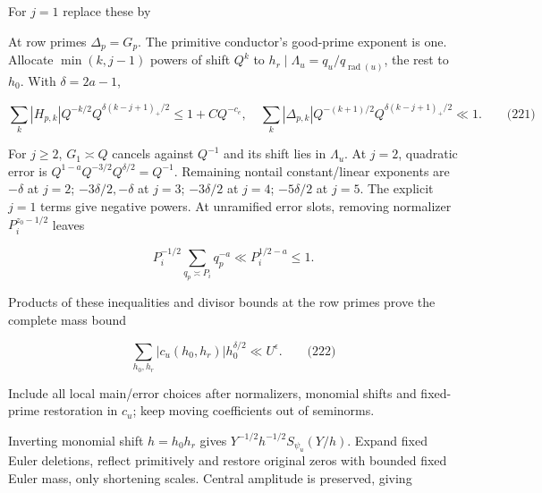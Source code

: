 For \(j=1\) replace these by

\par\noindent\resizebox{\linewidth}{!}{\begin{minipage}{\dimexpr\linewidth+5.77538pt\relax}\[
H_0=\frac{1-R_p/Q}{1-R_p},\quad
 H_1=\frac{\eta(p)Q^{-s}(1-QV)}{1-R_p},\quad
 G_0=\frac{c_pR_p(1-Q^{-1})}{1-R_p},\quad
 G_1=\frac{R_p/Q-QV}{1-R_p},\quad G_2=-H_1.
\]\end{minipage}}\par

At row primes \(\Delta_p=G_p\). The primitive conductor's good-prime exponent is one. Allocate \(\min(k,j-1)\) powers of shift \(Q^k\) to \(h_r\mid\Lambda_u=q_u/q_{\operatorname{rad}(u)}\), the rest to \(h_0\). With \(\delta=2a-1\),

\hypertarget{dr:rowmass}{}

\label{dr:rowmass}

\[
\sum_k|H_{p,k}|Q^{-k/2}Q^{\delta(k-j+1)_+/2}\le1+CQ^{-c_e},
 \quad
 \sum_k|\Delta_{p,k}|Q^{-(k+1)/2}Q^{\delta(k-j+1)_+/2}\ll1.
 \qquad\text{(221)}
\]

For \(j\ge2\), \(G_1\asymp Q\) cancels against \(Q^{-1}\) and its shift lies in \(\Lambda_u\). At \(j=2\), quadratic error is \(Q^{1-a}Q^{-3/2}Q^{\delta/2}=Q^{-1}\). Remaining nontail constant/linear exponents are \(-\delta\) at \(j=2\); \(-3\delta/2,-\delta\) at \(j=3\); \(-3\delta/2\) at \(j=4\); \(-5\delta/2\) at \(j=5\). The explicit \(j=1\) terms give negative powers. At unramified error slots, removing normalizer \(P_i^{z_0-1/2}\) leaves

\[
P_i^{-1/2}\sum_{q_p\asymp P_i}q_p^{-a}\ll P_i^{1/2-a}\le1.
\]

Products of these inequalities and divisor bounds at the row primes prove the complete mass bound

\hypertarget{dr:mass}{}

\label{dr:mass}

\[
\sum_{h_0,h_r}|c_u(h_0,h_r)|h_0^{\delta/2}\ll U^\epsilon.
 \qquad\text{(222)}
\]

Include all local main/error choices after normalizers, monomial shifts and fixed-prime restoration in \(c_u\); keep moving coefficients out of seminorms.

Inverting monomial shift \(h=h_0h_r\) gives \(Y^{-1/2}h^{-1/2}S_{\psi_u}(Y/h)\). Expand fixed Euler deletions, reflect primitively and restore original zeros with bounded fixed Euler mass, only shortening scales. Central amplitude is preserved, giving

